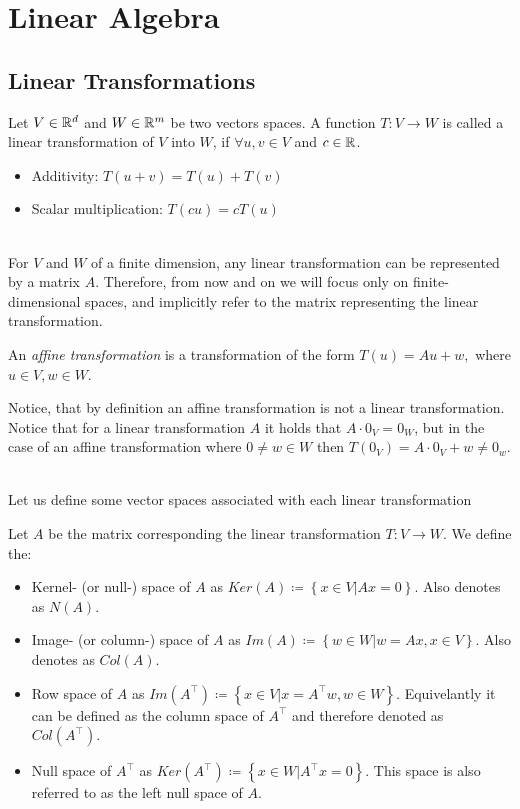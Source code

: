 \section{Linear Algebra}
\subsection{Linear Transformations}
\begin{definition}
	Let $V\in\mathbb{R}^d$ and $W\in\mathbb{R}^m$ be two vectors spaces. A function $T:V\rightarrow W$ is called a linear transformation of $V$ into $W$, if $\forall u, v \in V$ and $c\in \mathbb{R}$.
	\begin{itemize}
		\item Additivity: $T\left(u+v\right) = T\left(u\right)+T\left(v\right)$
		\item Scalar multiplication: $T \left(cu\right) = cT \left(u\right)$
	\end{itemize}
\end{definition}

~\\
For $V$  and $W$ of a finite dimension, any linear transformation can be represented by a matrix $A$. Therefore, from now and on we will focus only on finite-dimensional spaces, and implicitly refer to the matrix representing the linear transformation.


\begin{definition}
	An \textit{affine transformation} is a transformation of the form $T\left(u\right)=Au+w,$ where $u\in V, w\in W$.
\end{definition}

Notice, that by definition an affine transformation is not a linear transformation. Notice that for a linear transformation $A$ it holds that $A\cdot 0_V = 0_W$, but in the case of an affine transformation where $0\neq w\in W$ then $T\left(0_V\right)=A\cdot 0_V + w \neq 0_w$.


~\\Let us define some vector spaces associated with each linear transformation
\begin{definition}
Let $A$ be the matrix corresponding the linear transformation $T:V\rightarrow W$. We define the:
\begin{itemize}
	\item Kernel- (or null-) space of $A$ as $Ker\left(A\right)\coloneqq\left\{x\in V|Ax=0\right\}$. Also denotes as $N\left(A\right)$.
	\item Image- (or column-) space of $A$ as $Im\left(A\right)\coloneqq\left\{w\in W|w=Ax,x\in V\right\}$. Also denotes as $Col\left(A\right)$.
	\item Row space of $A$ as $Im\left(A^\top\right)\coloneqq\left\{x\in V|x=A^\top w,w\in W\right\}$. Equivelantly it can be defined as the column space of $A^\top$ and therefore denoted as $Col\left(A^\top\right)$.
	\item Null space of $A^\top$ as $Ker\left(A^\top\right)\coloneqq \left\{x\in W | A^\top x = 0\right\}$. This space is also referred to as the left null space of $A$.
\end{itemize}
\end{definition}

